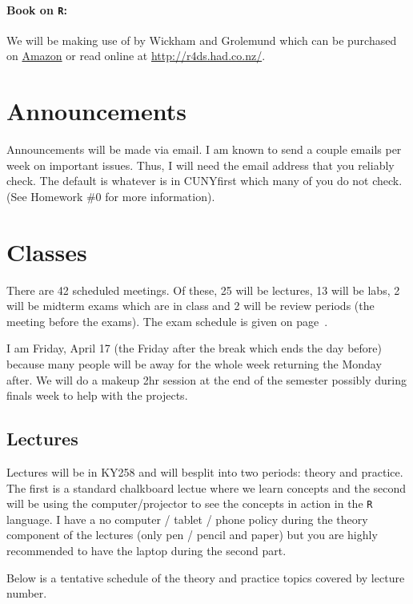 \documentclass[12pt]{article}
\begin{document}
\paragraph{Book on \texttt{R}:} We will be making use of  by Wickham and Grolemund which can be purchased on \href{https://www.amazon.com/R-Data-Science-Hadley-Wickham/dp/1491910399}{Amazon} or read online at \url{http://r4ds.had.co.nz/}.


\section*{Announcements}

Announcements will be made via email. I am known to send a couple emails per week on important issues. Thus, I will need the email address that you reliably check. The default is whatever is in CUNYfirst which many of you do not check. (See Homework \#0 for more information).

\section*{Classes}

There are 42 scheduled meetings. Of these, 25 will be lectures, 13 will be labs, 2 will be midterm exams which are in class and 2 will be review periods (the meeting before the exams). The exam schedule is given on page~\pageref{subsec:exam_schedule}.

I am  Friday, April 17 (the Friday after the break which ends the day before) because many people will be away for the whole week returning the Monday after. We will do a makeup 2hr session at the end of the semester possibly during finals week to help with the projects. 

\subsection*{Lectures}

Lectures will be in KY258 and will besplit into two periods: theory and practice. The first is a standard chalkboard lectue where we learn concepts and the second will be using the computer/projector to see the concepts in action in the \texttt{R} language. I have a no computer / tablet / phone policy during the theory component of the lectures (only pen / pencil and paper) but you are highly recommended to have the laptop during the second part.

Below is a tentative schedule of the theory and practice topics covered by lecture number. 
\end{document}
